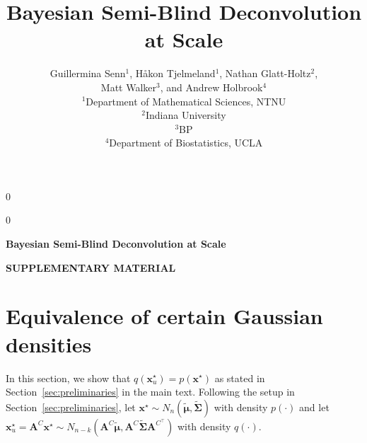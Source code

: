 \documentclass[12pt]{article}
\newcommand{\anon}{0}
\begin{document}
\def\spacingset#1{\renewcommand{\baselinestretch}%
{#1}\small\normalsize} \spacingset{1}



\anon
{
  \title{Bayesian Semi-Blind Deconvolution at Scale}
  \author{
    Guillermina Senn$^{1}$,
    Håkon Tjelmeland$^{1}$,
    Nathan Glatt-Holtz$^{2}$, \\
    Matt Walker$^{3}$,
    and Andrew Holbrook$^{4}$\\[0.5em]
    $^{1}$Department of Mathematical Sciences, NTNU\\
    $^{2}$Indiana University\\
    $^{3}$BP\\
    $^{4}$Department of Biostatistics, UCLA
    }
    \date{}
  \maketitle
} \fi

\anon
{
  \bigskip
  \bigskip
  \bigskip
  \begin{center}
    {\LARGE\bf Bayesian Semi-Blind Deconvolution at Scale}
    \end{center}
  \medskip
} \fi

\setcounter{figure}{0}
\setcounter{equation}{0}
\setcounter{section}{0}
\setcounter{page}{1}
\renewcommand{\thesection}{S.\arabic{section}}
\renewcommand{\theequation}{S.\arabic{equation}}


\begin{center}
    {\large \bf SUPPLEMENTARY MATERIAL}
\end{center} 

\spacingset{1.75} %

\section{Equivalence of certain Gaussian densities} \label{sec:equal_densities}
In this section, we show that $q(\bm{x}_u^{\star})=p(\bm{x}^{\star})$ as stated in Section~\ref{sec:preliminaries} in the main text. 
Following the setup in Section~\ref{sec:preliminaries}, let $\bm{x}^{\star} \sim N_n(\tilde{\bm{\mu}}, \tilde{\bm{\Sigma}})$ with density $p(\cdot)$ and let $\bm{x}_u^{\star} = \bm{A}^C \bm{x}^{\star} \sim N_{n-k}(\bm{A}^C \tilde{\bm{\mu}}, \bm{A}^C \tilde{\bm{\Sigma}} \bm{A}^{C^{\top}})$ with density $q(\cdot)$. 
\end{document}
